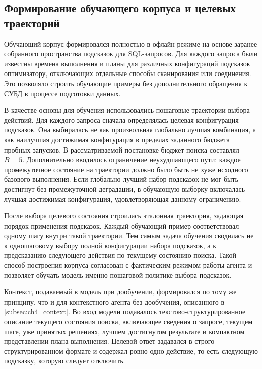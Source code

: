 \subsection{Формирование обучающего корпуса и целевых траекторий}\label{subsec:ch4_offline_finetuning}

Обучающий корпус формировался полностью в офлайн-режиме на основе заранее собранного пространства подсказок для SQL-запросов. Для каждого запроса были известны времена выполнения и планы для различных конфигураций подсказок оптимизатору, отключающих отдельные способы сканирования или соединения. Это позволяло строить обучающие примеры без дополнительного обращения к СУБД в процессе подготовки данных.

В качестве основы для обучения использовались пошаговые траектории выбора действий. Для каждого запроса сначала определялась целевая конфигурация подсказок. Она выбиралась не как произвольная глобально лучшая комбинация, а как наилучшая достижимая конфигурация в пределах заданного бюджета пробных запусков. В рассматриваемой постановке бюджет поиска составлял \(B=5\). Дополнительно вводилось ограничение неухудшающего пути: каждое промежуточное состояние на траектории должно было быть не хуже исходного базового выполнения. Если глобально лучший набор подсказок не мог быть достигнут без промежуточной деградации, в обучающую выборку включалась лучшая достижимая конфигурация, удовлетворяющая данному ограничению.

После выбора целевого состояния строилась эталонная траектория, задающая порядок применения подсказок. Каждый обучающий пример соответствовал одному шагу внутри такой траектории. Тем самым задача обучения сводилась не к одношаговому выбору полной конфигурации набора подсказок, а к предсказанию следующего действия по текущему состоянию поиска. Такой способ построения корпуса согласован с фактическим режимом работы агента и позволяет обучать модель именно пошаговой политике выбора подсказок.

Контекст, подаваемый в модель при дообучении, формировался по тому же принципу, что и для контекстного агента без дообучения, описанного в \cref{subsec:ch4_context}. Во вход модели подавалось текстово-структурированное описание текущего состояния поиска, включающее сведения о запросе, текущем шаге, уже принятых решениях, лучшем достигнутом результате и компактном представлении плана выполнения. Целевой ответ задавался в строго структурированном формате и содержал ровно одно действие, то есть следующую подсказку, которую следует отключить.

